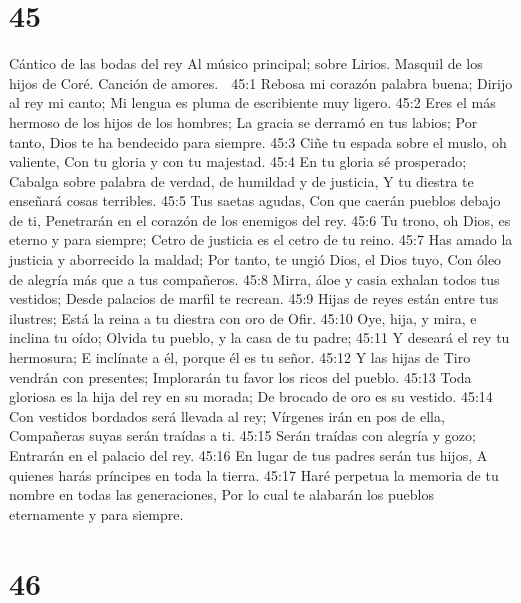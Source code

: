 \chapter{45}

Cántico de las bodas del rey 
Al músico principal; sobre Lirios. Masquil de los hijos de Coré. Canción de amores. 

45:1 Rebosa mi corazón palabra buena; 
Dirijo al rey mi canto; 
Mi lengua es pluma de escribiente muy ligero. 
45:2 Eres el más hermoso de los hijos de los hombres; 
La gracia se derramó en tus labios; 
Por tanto, Dios te ha bendecido para siempre. 
45:3 Ciñe tu espada sobre el muslo, oh valiente, 
Con tu gloria y con tu majestad. 
45:4 En tu gloria sé prosperado; 
Cabalga sobre palabra de verdad, de humildad y de justicia, 
Y tu diestra te enseñará cosas terribles. 
45:5 Tus saetas agudas, 
Con que caerán pueblos debajo de ti, 
Penetrarán en el corazón de los enemigos del rey. 
45:6 Tu trono, oh Dios, es eterno y para siempre; 
Cetro de justicia es el cetro de tu reino. 
45:7 Has amado la justicia y aborrecido la maldad; 
Por tanto, te ungió Dios, el Dios tuyo, 
Con óleo de alegría más que a tus compañeros. 
45:8 Mirra, áloe y casia exhalan todos tus vestidos; 
Desde palacios de marfil te recrean. 
45:9 Hijas de reyes están entre tus ilustres; 
Está la reina a tu diestra con oro de Ofir. 
45:10 Oye, hija, y mira, e inclina tu oído; 
Olvida tu pueblo, y la casa de tu padre; 
45:11 Y deseará el rey tu hermosura; 
E inclínate a él, porque él es tu señor. 
45:12 Y las hijas de Tiro vendrán con presentes; 
Implorarán tu favor los ricos del pueblo. 
45:13 Toda gloriosa es la hija del rey en su morada; 
De brocado de oro es su vestido. 
45:14 Con vestidos bordados será llevada al rey; 
Vírgenes irán en pos de ella, 
Compañeras suyas serán traídas a ti. 
45:15 Serán traídas con alegría y gozo; 
Entrarán en el palacio del rey. 
45:16 En lugar de tus padres serán tus hijos, 
A quienes harás príncipes en toda la tierra. 
45:17 Haré perpetua la memoria de tu nombre en todas las generaciones, 
Por lo cual te alabarán los pueblos eternamente y para siempre. 

\chapter{46}

